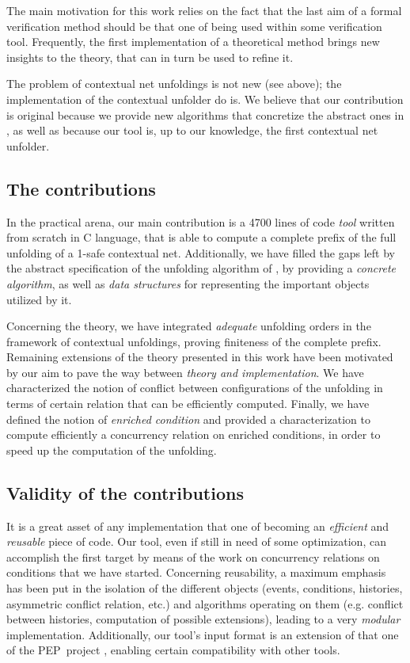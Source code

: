 \documentclass[11pt,a4paper]{article}
\begin{document}
The main motivation for this work relies on the fact that the last aim of a
formal verification method should be that one of being used within some
verification tool.  Frequently, the first implementation of a theoretical
method brings new insights to the theory, that can in turn be used to refine
it.

The problem of contextual net unfoldings is not new (see above); the
implementation of the contextual unfolder do is.  We believe that our
contribution is original because we provide new algorithms that concretize the
abstract ones in , as well as because our tool is, up to our
knowledge, the first contextual net unfolder.

\subsection*{The contributions}

In the practical arena, our main contribution is a 4700 lines of code
\emph{tool} written from scratch in C language, that is able to compute a
complete prefix of the full unfolding of a 1-safe contextual net.
Additionally, we have filled the gaps left by the abstract specification of the
unfolding algorithm of , by providing a \emph{concrete algorithm},
as well as \emph{data structures} for representing the important objects
utilized by it.

Concerning the theory, we have integrated \emph{adequate} unfolding orders
 in the framework of contextual unfoldings, proving finiteness of
the complete prefix.  Remaining extensions of the theory presented in this work
have been motivated by our aim to pave the way between \emph{theory and
implementation}.  We have characterized the notion of conflict between
configurations of the unfolding in terms of certain relation that can be
efficiently computed.  Finally, we have defined the notion of \emph{enriched
condition} and provided a characterization to compute efficiently a concurrency
relation on enriched conditions, in order to speed up the computation of the
unfolding.

\subsection*{Validity of the contributions}

It is a great asset of any implementation that one of becoming an
\emph{efficient} and \emph{reusable} piece of code.  Our tool, even if still in
need of some optimization, can accomplish the first target by means of the work
on concurrency relations on conditions that we have started.  Concerning
reusability, a maximum emphasis has been put in the isolation of the different
objects (events, conditions, histories, asymmetric conflict relation, etc.) and
algorithms operating on them (e.g. conflict between histories, computation of
possible extensions), leading to a very \emph{modular} implementation.
Additionally, our tool's input format is an extension of that one of the
PEP~project , enabling certain compatibility with other tools.
\end{document}
